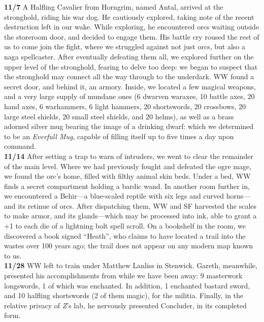 \documentclass[letterpaper]{article}
\begin{document}
\noindent \textbf{11/7} A Halfling Cavalier from Horngrim, named Antal, arrived at the stronghold, riding his war dog.  He cautiously explored, taking note of the recent destruction left in our wake.  While exploring, he encountered orcs waiting outside the storeroom door, and decided to engage them.  His battle cry roused the rest of us to come join the fight, where we struggled against not just orcs, but also a naga spellcaster.  After eventually defeating them all, we explored further on the upper level of the stronghold, fearing to delve too deep: we began to suspect that the stronghold may connect all the way through to the underdark.  WW found a secret door, and behind it, an armory.  Inside, we located a few magical weapons, and a very large supply of mundane ones (6 dwarven waraxes, 10 battle axes, 20 hand axes, 6 warhammers, 6 light hammers, 20 shortswords, 20 crossbows, 20 large steel shields, 20 small steel shields, and 20 helms), as well as a brass adorned silver mug bearing the image of a drinking dwarf: which we determined to be an \emph{Everfull Mug}, capable of filling itself up to five times a day upon command. \\ 

\noindent \textbf{11/14} After setting a trap to warn of intruders, we went to clear the remainder of the main level.  Where we had previously fought and defeated the ogre mage, we found the orc's home, filled with filthy animal skin beds.  Under a bed, WW finds a secret compartment holding a bardic wand.  In another room further in, we encountered a Behir---a blue-scaled reptile with six legs and curved horns---and its retinue of orcs.  After dispatching them, WW and SF harvested the scales to make armor, and its glands---which may be processed into ink, able to grant a +1 to each die of a lightning bolt spell scroll. On a bookshelf in the room, we discovered a book signed ``Heath'', who claims to have located a trail into the wastes over 100 years ago; the trail does not appear on any modern map known to us. \\

\noindent\textbf{11/28} WW left to train under Matthew Lanliss in Stenwick.   Gareth, meanwhile, presented his accomplishments from while we have been away: 9 masterwork longswords, 1 of which was enchanted. In addition, 1 enchanted bastard sword, and 10 halfling shortswords (2 of them magic), for the militia. Finally, in the relative privacy of \emph{Z}'s lab, he nervously presented Concluder, in its completed form.  \\
\end{document}
